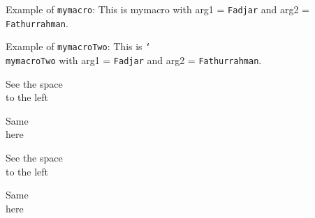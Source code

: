\documentclass{article}
\newcommand{\mymacro}[2]{
This is mymacro with arg1 = \texttt{#1} and arg2 = \texttt{#2}.
}
\DeclareRobustCommand{\mymacroTwo}[2]{
This is \texttt{\char`\\mymacroTwo} with arg1 = \texttt{#1} and arg2 = \texttt{#2}.
}
\newenvironment{simple}{\noindent}{\par\noindent}
\newenvironment{simpleCorrect}%
{\noindent\ignorespaces}%
{\par\noindent\ignorespacesafterend}
\begin{document}
Example of \verb|mymacro|: \mymacro{Fadjar}{Fathurrahman}

Example of \verb|mymacroTwo|: \mymacroTwo{Fadjar}{Fathurrahman}

\begin{simple}
See the space\\to the left
\end{simple}
Same\\here

\begin{simpleCorrect}
See the space\\to the left
\end{simpleCorrect}
Same\\here
\end{document}

